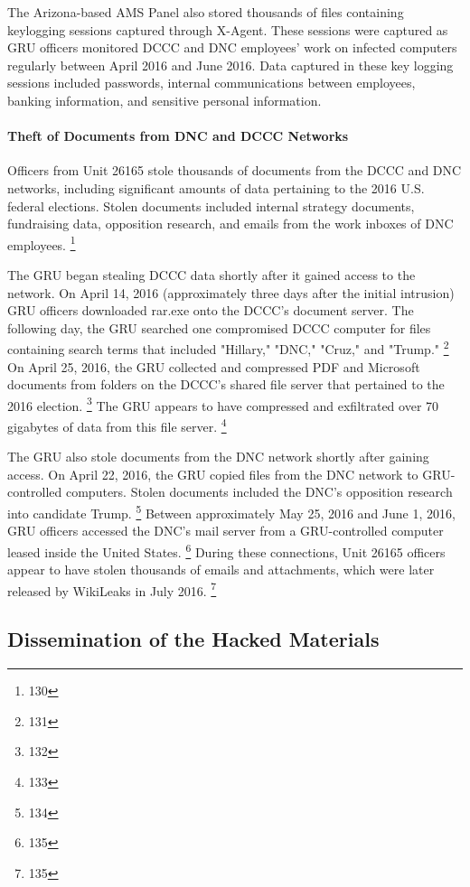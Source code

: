 The Arizona-based AMS Panel also stored thousands of files containing keylogging sessions captured through X-Agent.
These sessions were captured as GRU officers monitored DCCC and DNC employees' work on infected computers regularly between April 2016 and June 2016.
Data captured in these key logging sessions included passwords, internal communications between employees, banking information, and sensitive personal information.

\paragraph{Theft of Documents from DNC and DCCC Networks}

Officers from Unit 26165 stole thousands of documents from the DCCC and DNC networks, including significant amounts of data pertaining to the 2016 U.S. federal elections.
Stolen documents included internal strategy documents, fundraising data, opposition research, and emails from the work inboxes of DNC employees.%
\footnote{130}

The GRU began stealing DCCC data shortly after it gained access to the network.
On April 14, 2016 (approximately three days after the initial intrusion) GRU officers downloaded rar.exe onto the DCCC's document server.
The following day, the GRU searched one compromised DCCC computer for files containing search terms that included "Hillary," "DNC," "Cruz," and "Trump."%
\footnote{131}
On April 25, 2016, the GRU collected and compressed PDF and Microsoft documents from folders on the DCCC's shared file server that pertained to the 2016 election.%
\footnote{132}
The GRU appears to have compressed and exfiltrated over 70 gigabytes of data from this file server.%
\footnote{133}

The GRU also stole documents from the DNC network shortly after gaining access.
On April 22, 2016, the GRU copied files from the DNC network to GRU-controlled computers.
Stolen documents included the DNC's opposition research into candidate Trump.%
\footnote{134}
Between approximately May 25, 2016 and June 1, 2016, GRU officers accessed the DNC's mail server from a  GRU-controlled computer leased inside the United States.%
\footnote{135}
During these connections, Unit 26165 officers appear to have stolen thousands of emails and attachments, which were later released by WikiLeaks in July 2016.%
\footnote{135}

\subsection{Dissemination of the Hacked Materials}

